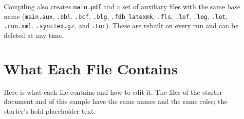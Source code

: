 Compiling also creates \texttt{main.pdf} and a set of auxiliary files with the same base name (\texttt{main.aux}, \texttt{.bbl}, \texttt{.bcf}, \texttt{.blg}, \texttt{.fdb\_latexmk}, \texttt{.fls}, \texttt{.lof}, \texttt{.log}, \texttt{.lot}, \texttt{.run.xml}, \texttt{.synctex.gz}, and \texttt{.toc}). These are rebuilt on every run and can be deleted at any time.

\section{What Each File Contains}
\label{sec:filedescriptions}

Here is what each file contains and how to edit it. The files of the starter document and of this sample have the same names and the same roles; the starter's hold placeholder text.

